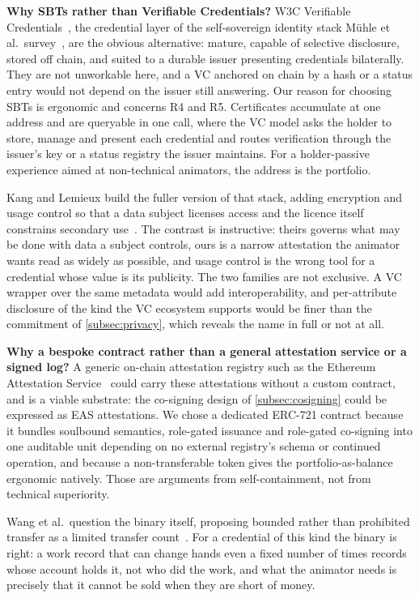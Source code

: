\textbf{Why SBTs rather than Verifiable Credentials?}
W3C Verifiable Credentials~\cite{sporny2022vc}, the credential layer of the
self-sovereign identity stack M{\"u}hle et al.\ survey~\cite{muhle2018ssi}, are the
obvious alternative: mature, capable of selective disclosure, stored off chain, and
suited to a durable issuer presenting credentials bilaterally. They are not
unworkable here, and a VC anchored on chain by a hash or a status entry would not
depend on the issuer still answering. Our reason for choosing SBTs is ergonomic and
concerns R4 and R5. Certificates accumulate at one address and are queryable in one
call, where the VC model asks the holder to store, manage and present each credential
and routes verification through the issuer's key or a status registry the issuer
maintains. For a holder-passive experience aimed at non-technical animators, the
address is the portfolio.

Kang and Lemieux build the fuller version of that stack, adding encryption and usage
control so that a data subject licenses access and the licence itself constrains
secondary use~\cite{kang2021ssi}. The contrast is instructive: theirs governs what may
be done with data a subject controls, ours is a narrow attestation the animator wants
read as widely as possible, and usage control is the wrong tool for a credential whose
value is its publicity. The two families are not exclusive. A VC wrapper over the same
metadata would add interoperability, and per-attribute disclosure of the kind the VC
ecosystem supports would be finer than the commitment of \cref{subsec:privacy}, which
reveals the name in full or not at all.

\textbf{Why a bespoke contract rather than a general attestation service or a
signed log?}
A generic on-chain attestation registry such as the Ethereum Attestation
Service~\cite{eas} could carry these attestations without a custom contract, and is a
viable substrate: the co-signing design of \cref{subsec:cosigning} could be expressed
as EAS attestations. We chose a dedicated ERC-721 contract because it bundles
soulbound semantics, role-gated issuance and role-gated co-signing into one auditable
unit depending on no external registry's schema or continued operation, and because a
non-transferable token gives the portfolio-as-balance ergonomic natively. Those are
arguments from self-containment, not from technical superiority.

Wang et al.\ question the binary itself, proposing bounded rather than prohibited
transfer as a limited transfer count~\cite{wang2026counted}. For a credential of this
kind the binary is right: a work record that can change hands even a fixed number of
times records whose account holds it, not who did the work, and what the animator
needs is precisely that it cannot be sold when they are short of money.

